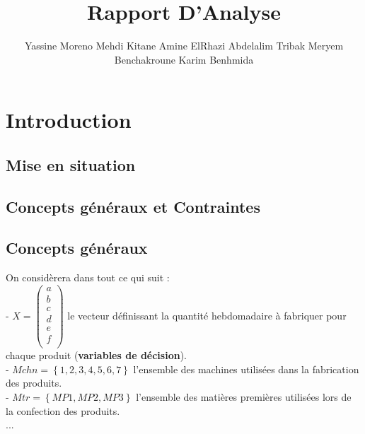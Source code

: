 \documentclass[a4paper, 11pt]{article}
\title{Rapport D'Analyse}
\author{Yassine Moreno \cr Mehdi Kitane \cr Amine ElRhazi \cr Abdelalim Tribak \cr Meryem Benchakroune \cr Karim Benhmida}
\begin{document}
\begin{LARGE}
\maketitle
\end{LARGE}

\tableofcontents
\newpage

\section{Introduction}
\subsection{Mise en situation}
\subsection{Concepts généraux et Contraintes}
\subsection*{Concepts généraux}
On considèrera dans tout ce qui suit : \\
- $X = \begin{pmatrix}
        a\\
        b\\
        c\\
        d\\
        e\\
        f\\
    \end{pmatrix}$ le vecteur définissant la quantité hebdomadaire à fabriquer pour chaque produit (\textbf{variables de décision}).\\
- $Mchn = \left\{1, 2, 3, 4, 5, 6, 7\right\}$ l'ensemble des machines utilisées dans la fabrication des produits.\\
- $Mtr = \left\{MP1,MP2,MP3\right\}$ l'ensemble des matières premières utilisées lors de la confection des produits.\\
...
\end{document}
